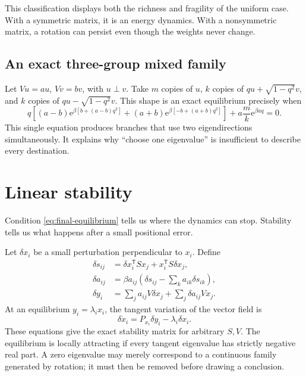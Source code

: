 \documentclass[11pt,a4paper]{article}
\theoremstyle{definition}
\newcommand{\e}{\mathrm e}
\newcommand{\T}{\mathsf T}
\begin{document}
This classification displays both the richness and fragility of the uniform case. With
a symmetric matrix, it is an energy dynamics. With a nonsymmetric matrix, a rotation
can persist even though the weights never change.

\subsection{An exact three-group mixed family}

Let $Vu=au$, $Vv=bv$, with $u\perp v$. Take $m$ copies of $u$, $k$ copies of
$qu+\sqrt{1-q^2}v$, and $k$ copies of $qu-\sqrt{1-q^2}v$. This shape is an exact
equilibrium precisely when
\begin{equation}
\boxed{
q\left[(a-b)\e^{\beta[b+(a-b)q^2]}
 +(a+b)\e^{\beta[-b+(a+b)q^2]}\right]
 +a\frac{m}{k}\e^{\beta aq}=0.}                           \label{eq:mixed-family}
\end{equation}
This single equation produces branches that use two eigendirections simultaneously.
It explains why ``choose one eigenvalue'' is insufficient to describe every destination.

\section{Linear stability}
\label{sec:stability}

Condition \eqref{eq:final-equilibrium} tells us where the dynamics can stop. Stability
tells us what happens after a small positional error.

Let $\delta x_i$ be a small perturbation perpendicular to $x_i$. Define
\begin{align}
 \delta s_{ij}
 &=\delta x_i^{\T}Sx_j+x_i^{\T}S\delta x_j,\\
 \delta a_{ij}
 &=\beta a_{ij}\left(\delta s_{ij}-\sum_k a_{ik}\delta s_{ik}\right),\\
 \delta y_i
 &=\sum_j a_{ij}V\delta x_j+\sum_j\delta a_{ij}Vx_j.       \label{eq:variations}
\end{align}
At an equilibrium $y_i=\lambda_i x_i$, the tangent variation of the vector field is
\begin{equation}
 \boxed{\quad \delta\dot x_i=P_{x_i}\delta y_i-\lambda_i\delta x_i.\quad}
                                                                    \label{eq:tangent-jacobian}
\end{equation}
These equations give the exact stability matrix for arbitrary $S,V$. The equilibrium
is locally attracting if every tangent eigenvalue has strictly negative real part. A
zero eigenvalue may merely correspond to a continuous family generated by rotation; it
must then be removed before drawing a conclusion.
\end{document}
